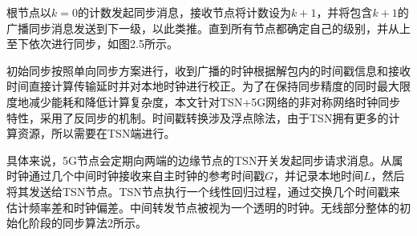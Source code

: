 \documentclass[UTF8,a4paper,12pt]{ctexart}
\numberwithin{equation}{section}
\begin{document}
根节点以$k=0$的计数发起同步消息，接收节点将计数设为$k+1$，并将包含$k+1$的广播同步消息发送到下一级，以此类推。直到所有节点都确定自己的级别，并从上至下依次进行同步，如图2.5所示。

初始同步按照单向同步方案进行，收到广播的时钟根据解包内的时间戳信息和接收时间直接计算传输延时并对本地时钟进行校正。为了在保持同步精度的同时最大限度地减少能耗和降低计算复杂度，本文针对TSN+5G网络的非对称网络时钟同步特性，采用了反同步的机制\cite{8935413}。时间戳转换涉及浮点除法，由于TSN拥有更多的计算资源，所以需要在TSN端进行。

具体来说，5G节点会定期向两端的边缘节点的TSN开关发起同步请求消息。从属时钟通过几个中间时钟接收来自主时钟的参考时间戳$G$，并记录本地时间$L$，然后将其发送给TSN节点。TSN节点执行一个线性回归过程，通过交换几个时间戳来估计频率差和时钟偏差。中间转发节点被视为一个透明的时钟。无线部分整体的初始化阶段的同步算法2所示。
\end{document}

